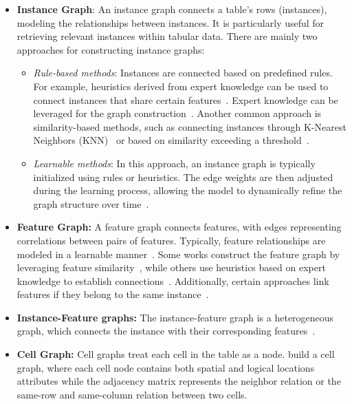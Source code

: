 \begin{itemize}[leftmargin=*]
    \item \textbf{Instance Graph}: An instance graph connects a table's rows (instances), modeling the relationships between instances. It is particularly useful for retrieving relevant instances within tabular data. There are mainly two approaches for constructing instance graphs:
    
    \begin{itemize}[leftmargin=*]
        \item \textit{Rule-based methods}: Instances are connected based on predefined rules. For example, heuristics derived from expert knowledge can be used to connect instances that share certain features~\citep{lu2021weighted}. Expert knowledge can be leveraged for the graph construction~\citep{parisot2018disease}. Another common approach is similarity-based methods, such as connecting instances through K-Nearest Neighbors (KNN)~\citep{gu2022structure, errica2024class} or based on similarity exceeding a threshold~\citep{spinelli2020missing, chen2023gedi}.
        \item \textit{Learnable methods}: In this approach, an instance graph is typically initialized using rules or heuristics. The edge weights are then adjusted during the learning process, allowing the model to dynamically refine the graph structure over time~\citep{kang2021k, liao2023tabgsl, cosmo2020latent, kazi2022differentiable}.
    \end{itemize}
    

    \item \textbf{Feature Graph:} A feature graph connects features, with edges representing correlations between pairs of features. Typically, feature relationships are modeled in a learnable manner~\citep{yan2023t2g, zhou2022table2graph}. Some works construct the feature graph by leveraging feature similarity~\citep{guo2021tabgnn, li2019fi}, while others use heuristics based on expert knowledge to establish connections~\citep{li2024graph}. Additionally, certain approaches link features if they belong to the same instance~\citep{rao2020xfraud}.

    \item \textbf{Instance-Feature graphs:} The instance-feature graph is a heterogeneous graph, which connects the instance with their corresponding features~\citep{guo2021dual, you2020handling, wang2021retrieving, wu2021towards}. 

    \item \textbf{Cell Graph:} Cell graphs treat each cell in the table as a node. \citet{xue2021tgrnet} build a cell graph, where each cell node contains both spatial and logical locations attributes while the adjacency matrix represents the neighbor relation or the same-row and same-column relation between two cells.


\end{itemize}
